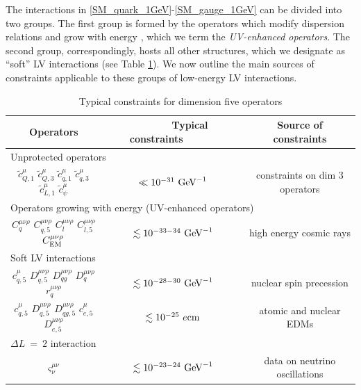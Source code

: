 \documentclass[12pt,preprintnumbers,nofootinbib]{revtex4}
\newcommand{\wt}{\widetilde}
\newcommand{\el}{{\rm EM}}
\newcommand{\GeV}{{\rm GeV}}
\begin{document}
	The interactions in \eqref{SM_quark_1GeV}-\eqref{SM_gauge_1GeV} 
	can be divided into two groups.
	The first group is formed by the operators which modify dispersion relations
	and grow with energy \cite{MP:}, which we term the {\it UV-enhanced operators}.
	The second group, correspondingly, hosts all other
	structures, which we designate as ``soft'' LV interactions  
	(see Table \ref{constr_table}).
	We now outline the main sources of constraints applicable to these groups of 
	low-energy LV interactions.

\begin{table}[tb]
\caption{Typical constraints for dimension five operators}
\label{constr_table}
\begin{tabular}{|ccc|}
\hline
	\multicolumn{1}{|c|}{Operators} & 
	\multicolumn{1}{|c|}{~~~~~~Typical constraints~~~~~~} & 
	\multicolumn{1}{|c|}{Source of constraints} \\
\hline
	\multicolumn{3}{|l|}{\quad Unprotected operators} \\
\hline
	$ \wt{c}_{Q,1}^\mu  $
	$ \wt{c}_{Q,3}^\mu  $
	$ \wt{c}_{q,1}^\mu  $
	$ \wt{c}_{q,3}^\mu  $
	$ \wt{c}_{L,1}^\mu  $
	$ \wt{c}_{\psi}^\mu $  &
	$ \ll 10^{-31}~{\rm GeV}^{-1} $ &
	constraints on dim 3 operators
	\\
\hline
	\multicolumn{3}{|l|}{\quad Operators growing with energy (UV-enhanced operators)} \\
\hline
	$ C_{q}^{\mu\nu\rho} $ $ C_{q,5}^{\mu\nu\rho} $
	$ C_l^{\mu\nu\rho} $  $ C_{l,5}^{\mu\nu\rho} $
	$ C^{\mu\nu\rho}_\el $ &
	$ \lesssim 10^{-33-34}~{\rm GeV}^{-1} $
	&
	high energy cosmic rays
	\\
\hline
	\multicolumn{3}{|l|}{\quad Soft LV interactions} \\
\hline
	$ c^\mu_{q,5} $ $ D^{\mu\nu\rho}_{q,5} $
	$ D_{qg}^{\mu\nu\rho} $  $ D_q^{\mu\nu\rho} $  $ r_q^{\mu\nu\rho} $ &
	$ \lesssim 10^{-28-30}~{\rm GeV}^{-1} $     &
	nuclear spin precession \\
\hline
	$ c^\mu_{q,5} $ $ D^{\mu\nu\rho}_{q,5} $ 
	$ D^{\mu\nu\rho}_{qg,5} $ 
	$ c^\mu_{e,5} $ $ D^{\mu\nu\rho}_{e,5} $ &
	$ \lesssim 10^{-25}~e{\rm cm} $          &
	atomic and nuclear EDMs \\
\hline
	\multicolumn{3}{|l|}{\quad $ \Delta L ~=~ 2 $ interaction} \\
\hline
	$ \varsigma_\nu^{\mu\nu} $          &
	$ \lesssim 10^{-23-24}~\GeV^{-1} $       &
	data on neutrino oscillations \\
\hline
\end{tabular}
\end{table}
	
\end{document}
